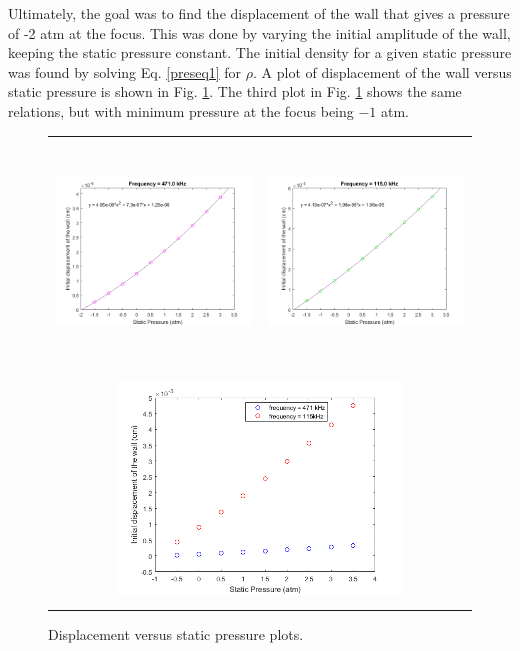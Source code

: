 Ultimately, the goal was to find the displacement of the wall that gives a pressure of -2 atm at the focus. This was done by varying the initial amplitude of the wall, keeping the static pressure constant. The initial density for a given static pressure was found by solving Eq. \ref{preseq1} for $\rho$. A plot of displacement of the wall versus static pressure is shown in Fig. \ref{disvspress}. The third plot in Fig. \ref{disvspress} shows the same relations, but with minimum pressure at the focus being $-1$ atm.

\begin{figure}[H]
\begin{tabular}{cc}
\includegraphics[width=75mm, height=60mm]{Nonlinear_correction/p_-2_hf.png} 
& \includegraphics[width=75mm, height=60mm]{Nonlinear_correction/p_-2_lf.png}\\
\multicolumn{2}{c}{\includegraphics[width=75mm, height=60mm]{Nonlinear_correction/p-minus1.png}}\\
\end{tabular}
\caption{Displacement versus static pressure plots.}
\label{disvspress}
\end{figure}

